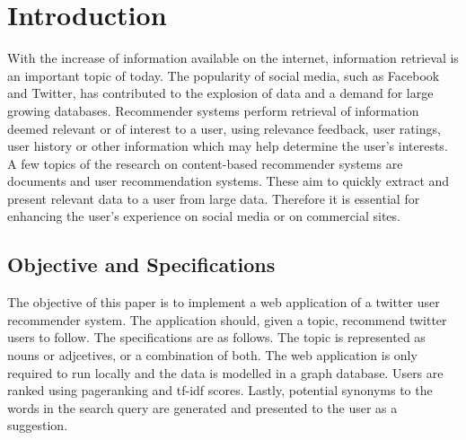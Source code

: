 \section{Introduction}
\label{sec:intro}

With the increase of information available on the internet, information retrieval is an important topic of today. The popularity of social media, such as Facebook and Twitter, has contributed to the explosion of data and a demand for large growing databases. Recommender systems perform retrieval of information deemed relevant or of interest to a user, using relevance feedback, user ratings, user history or other information which may help determine the user’s interests. A few topics of the research on content-based recommender systems are documents \cite{digLib} \cite{contBased} and user recommendation \cite{userRec} systems. These aim to quickly extract and present relevant data to a user from large data. Therefore it is essential for enhancing the user’s experience on social media or on commercial sites.  

\subsection{Objective and Specifications}
The objective of this paper is to implement a web application of a twitter user recommender system. The application should, given a topic, recommend twitter users to follow. The specifications are as follows. The topic is represented as nouns or adjcetives, or a combination of both. The web application is only required to run locally and the data is modelled in a graph database. Users are ranked using pageranking and tf-idf scores. Lastly, potential synonyms to the words in the search query are generated and presented to the user as a suggestion.


